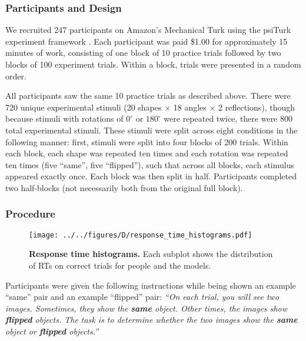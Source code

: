 \documentclass[10pt,letterpaper]{article}
\begin{document}
\subsubsection{Participants and Design}

We recruited 247 participants on Amazon's Mechanical Turk using the
psiTurk experiment framework \cite{Mcdonnell12}. Each participant was
paid \$1.00 for approximately 15 minutes of work, consisting of one
block of 10 practice trials followed by two blocks of 100 experiment
trials. Within a block, trials were presented in a random order.

All participants saw the same 10 practice trials as described
above. There were 720 unique experimental stimuli (20 shapes $\times$
18 angles $\times$ 2 reflections), though because stimuli with
rotations of $0^\circ$ or $180^\circ$ were repeated twice, there were
800 total experimental stimuli. These stimuli were split across eight
conditions in the following manner: first, stimuli were split into
four blocks of 200 trials. Within each block, each shape was repeated
ten times and each rotation was repeated ten times (five ``same'',
five ``flipped''), such that across all blocks, each stimulus appeared
exactly once. Each block was then split in half. Participants
completed two half-blocks (not necessarily both from the original full
block).

\subsubsection{Procedure}

\begin{figure*}[t]
  \begin{center}
    \texttt{[image: ../../figures/D/response\_time\_histograms.pdf]}
    \caption{\textbf{Response time histograms.} Each subplot shows the
      distribution of RTs on correct trials for people and the
      models.}
    \label{fig:histograms}
  \end{center}
\end{figure*}

Participants were given the following instructions while being shown
an example ``same'' pair and an example ``flipped'' pair: \textit{``On
  each trial, you will see two images. Sometimes, they show the
  \textbf{same} object. Other times, the images show \textbf{flipped}
  objects. The task is to determine whether the two images show the
  \textbf{same} object or \textbf{flipped} objects.''}
\end{document}
